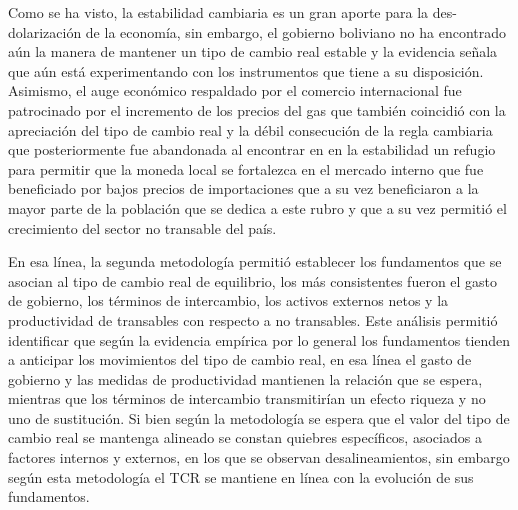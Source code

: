 \documentclass[12pt,letterpaper]{article}
\begin{document}
Como se ha visto, la estabilidad cambiaria es un gran aporte para la des-dolarización de la economía, sin embargo, el gobierno boliviano no ha encontrado aún la manera de mantener un tipo de cambio real estable y la evidencia señala que aún está experimentando con los instrumentos que tiene a su disposición. Asimismo, el auge económico respaldado por el comercio internacional fue patrocinado por el incremento de los precios del gas que también coincidió con la apreciación del tipo de cambio real y la débil consecución de la regla cambiaria que posteriormente fue abandonada al encontrar en en la estabilidad un refugio para permitir que la moneda local se fortalezca en el mercado interno que fue beneficiado por bajos precios de importaciones que a su vez beneficiaron a la mayor parte de la población que se dedica a este rubro y que a su vez permitió el crecimiento del sector no transable del país.



En esa línea, la segunda metodología permitió establecer los fundamentos que se asocian al tipo de cambio real de equilibrio, los más consistentes fueron el gasto de gobierno, los términos de intercambio, los activos externos netos y la productividad de transables con respecto a no transables. Este análisis permitió identificar que según la evidencia empírica por lo general los fundamentos tienden a anticipar los movimientos del tipo de cambio real, en esa línea el gasto de gobierno y las medidas de productividad mantienen la relación que se espera, mientras que los términos de intercambio transmitirían un efecto riqueza y no uno de sustitución. Si bien según la metodología se espera que el valor del tipo de cambio real se mantenga alineado se constan quiebres específicos, asociados a factores internos y externos, en los que se observan desalineamientos, sin embargo según esta metodología el TCR se mantiene en línea con la evolución de sus fundamentos. 

\end{document}
